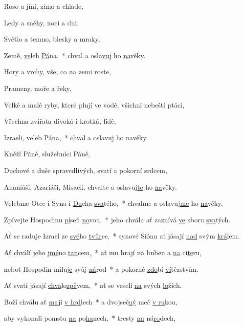 Roso a jíní, \velebteA
zimo a chlade, \velebteB

Ledy a sněhy, \velebteA
noci a dni, \velebteB

Světlo a temno, \velebteA
blesky a mraky, \velebteB

Země, \underline{ve}leb \underline{Pá}na,~*
chval a osla\underline{vuj} ho \underline{na}věky.

Hory a vrchy, \velebteA
vše, co na zemi roste, \velebteB

Prameny, \velebteA
moře a řeky, \velebteB

Velké a malé ryby, které plují ve vodě, \velebteA
všichni nebeští ptáci, \velebteB

Všechna zvířata divoká i krotká, \velebteA
lidé, \velebteB

Izraeli, \underline{ve}leb \underline{Pá}na,~*
chval a osla\underline{vuj} ho \underline{na}věky.

Kněží Páně, \velebteA
služebníci Páně, \velebteB

Duchové a duše spravedlivých, \velebteA
svatí a pokorní srdcem, \velebteB

Ananiáši, Azariáši, Misaeli, \velebteA
chvalte a oslavuj\underline{te} ho \underline{na}věky.

Velebme Otce i Syna i \underline{Du}cha \underline{sva}tého,~*
chvalme a oslavuj\underline{me} ho \underline{na}věky.



Zpívejte Hospodinu \underline{pí}seň \underline{no}vou,~*
jeho chvála ať zaznívá \underline{ve} sboru \underline{sva}tých.

Ať se raduje Izrael ze \underline{své}ho \underline{tvůr}ce,~*
synové Siónu ať jásají \underline{nad} svým \underline{krá}lem.

Ať chválí jeho \underline{jmé}no \underline{tan}cem,~*
ať mu hrají na buben a \underline{na} ci\underline{te}ru,

neboť Hospodin milu\underline{je} svůj \underline{ná}rod~*
a pokorné \underline{zdo}bí \underline{ví}tězstvím.

Ať svatí jásají \underline{chva}lo\underline{zpě}vem,~*
ať se veselí \underline{na} svých \underline{lo}žích.

Boží chválu ať \underline{ma}jí \underline{v hrd}lech~*
a dvojseč\underline{ný} meč \underline{v ru}kou,

aby vykonali pomstu \underline{na} po\underline{ha}nech,~*
tresty \underline{na} ná\underline{ro}dech,

